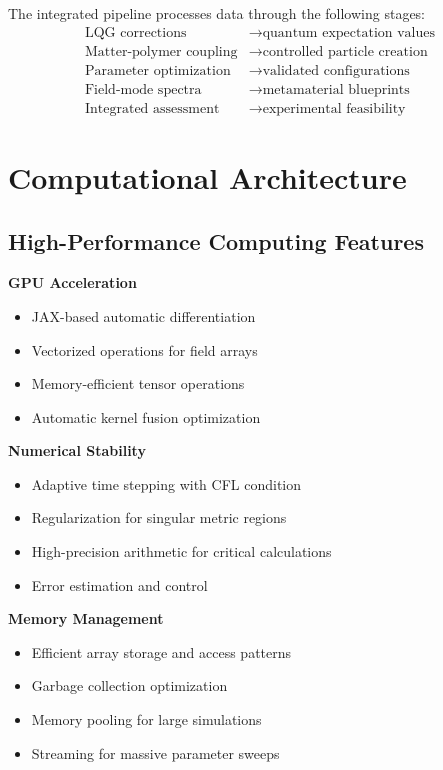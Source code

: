 \documentclass[11pt]{article}
\begin{document}
The integrated pipeline processes data through the following stages:
\begin{align}
\text{LQG corrections} &\rightarrow \text{quantum expectation values} \\
\text{Matter-polymer coupling} &\rightarrow \text{controlled particle creation} \\
\text{Parameter optimization} &\rightarrow \text{validated configurations} \\
\text{Field-mode spectra} &\rightarrow \text{metamaterial blueprints} \\
\text{Integrated assessment} &\rightarrow \text{experimental feasibility}
\end{align}

\section{Computational Architecture}

\subsection{High-Performance Computing Features}

\textbf{GPU Acceleration}
\begin{itemize}
\item JAX-based automatic differentiation
\item Vectorized operations for field arrays
\item Memory-efficient tensor operations
\item Automatic kernel fusion optimization
\end{itemize}

\textbf{Numerical Stability}
\begin{itemize}
\item Adaptive time stepping with CFL condition
\item Regularization for singular metric regions
\item High-precision arithmetic for critical calculations
\item Error estimation and control
\end{itemize}

\textbf{Memory Management}
\begin{itemize}
\item Efficient array storage and access patterns
\item Garbage collection optimization
\item Memory pooling for large simulations
\item Streaming for massive parameter sweeps
\end{itemize}
\end{document}
